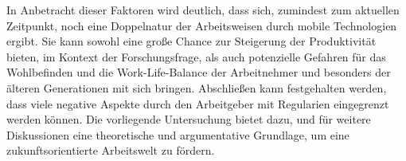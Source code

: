 \documentclass[12pt,a4paper]{article}
\begin{document}
In Anbetracht dieser Faktoren wird deutlich, dass sich, zumindest zum aktuellen Zeitpunkt, noch eine Doppelnatur der Arbeitsweisen durch mobile Technologien ergibt. Sie kann sowohl eine große Chance zur Steigerung der Produktivität bieten, im Kontext der Forschungsfrage, als auch potenzielle Gefahren für das Wohlbefinden und die Work-Life-Balance der Arbeitnehmer und besonders der älteren Generationen mit sich bringen. Abschließen kann festgehalten werden, dass viele negative Aspekte durch den Arbeitgeber mit Regularien eingegrenzt werden können. Die vorliegende Untersuchung bietet dazu, und für weitere Diskussionen eine theoretische und argumentative Grundlage, um eine zukunftsorientierte Arbeitswelt zu fördern.

\printbibliography
\end{document}
